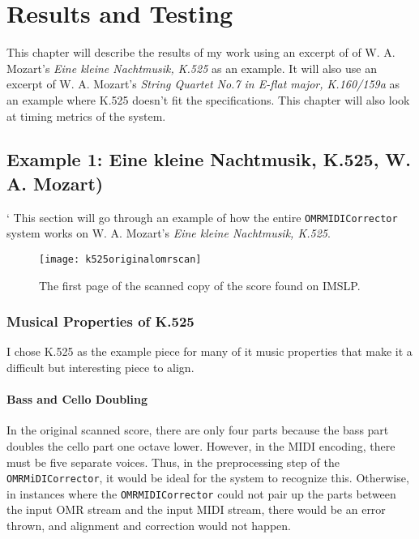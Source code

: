 \chapter{Results and Testing}
This chapter will describe the results of my work using an excerpt of of W. A. Mozart's \textit{Eine kleine Nachtmusik, K.525} as an example. It will also use an excerpt of W. A. Mozart's \textit{String Quartet No.7 in E-flat major, K.160/159a} as an example where K.525 doesn't fit the specifications. This chapter will also look at timing metrics of the system.

\section{Example 1: Eine kleine Nachtmusik, K.525, W. A. Mozart)}		`
This section will go through an example of how the entire \texttt{OMRMIDICorrector} system works on W. A. Mozart's \textit{Eine kleine Nachtmusik, K.525}.

\begin{figure}[H]
\centering
\texttt{[image: k525originalomrscan]}
\caption{The first page of the scanned copy of the score found on IMSLP.}
\end{figure}

\subsection{Musical Properties of K.525}
I chose K.525 as the example piece for many of it music properties that make it a difficult but interesting piece to align. 

\subsubsection{Bass and Cello Doubling}
In the original scanned score, there are only four parts because the bass part doubles the cello part one octave lower. However, in the MIDI encoding, there must be five separate voices. Thus, in the preprocessing step of the \texttt{OMRMiDICorrector}, it would be ideal for the system to recognize this. Otherwise, in instances where the \texttt{OMRMIDICorrector} could not pair up the parts between the input OMR stream and the input MIDI stream, there would be an error thrown, and alignment and correction would not happen. 

